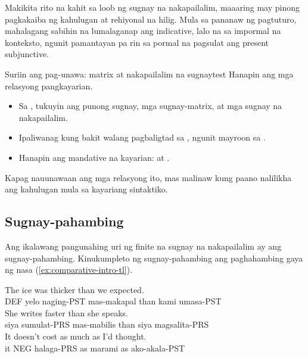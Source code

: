Makikita rito na kahit sa loob ng sugnay na nakapailalim, maaaring may pinong pagkakaiba ng kahulugan at rehiyonal na hilig. Mula sa pananaw ng pagtuturo, mahalagang sabihin na lumalaganap ang indicative, lalo na sa impormal na konteksto, ngunit pamantayan pa rin sa pormal na pagsulat ang present subjunctive.

\begin{tblsframedsymbol}{Suriin ang pag-unawa: matrix at nakapailalim na sugnay}{test}
Hanapin ang mga relasyong pangkayarian.
\begin{itemize}[noitemsep, leftmargin=*]
    \item Sa , tukuyin ang punong sugnay, mga sugnay-matrix, at mga sugnay na nakapailalim.
    \item Ipaliwanag kung bakit walang pagbaligtad sa , ngunit mayroon sa .
    \item Hanapin ang mandative na kayarian:  at .
\end{itemize}
Kapag nauunawaan ang mga relasyong ito, mas malinaw kung paano nalilikha ang kahulugan mula sa kayariang sintaktiko.
\end{tblsframedsymbol}

\subsection{Sugnay-pahambing}

Ang ikalawang pangunahing uri ng finite na sugnay na nakapailalim ay ang sugnay-pahambing. Kinukumpleto ng sugnay-pahambing ang paghahambing gaya ng nasa (\ref{ex:comparative-intro-tl}).

\ea \label{ex:comparative-intro-tl}
    \ea \gll The ice was thicker than {\ob}we expected{\cb}.\\
        DEF yelo naging-PST mas-makapal than kami umasa-PST\\
    \glt {}
    \ex \gll She writes faster than {\ob}she speaks{\cb}.\\
        siya sumulat-PRS mas-mabilis than siya magsalita-PRS\\
    \glt {}
    \ex \gll It doesn't cost as much as {\ob}I'd thought{\cb}.\\
        it NEG halaga-PRS as marami as ako-akala-PST\\
    \glt {}
    \z
\z

